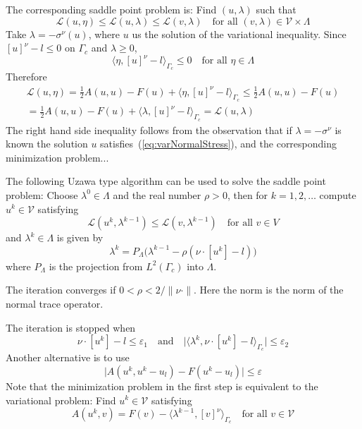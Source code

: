 \documentclass[12pt,a4paper]{article}
\numberwithin{equation}{section}
\numberwithin{table}{section}
\numberwithin{figure}{section}
\newcommand{\half}{\ensuremath{\frac{1}{2}}}
\newcommand{\V}{\ensuremath{\mathcal{V}}}
\newcommand{\Lagrange}{\ensuremath{\mathcal L}}
\renewcommand{\epsilon}{\varepsilon}
\providecommand{\abs}[1]{\lvert #1 \rvert}
\providecommand{\norm}[1]{\lVert #1 \rVert}
\providecommand{\dualp}[2]{\langle #1, #2 \rangle}
\newcommand{\qforall}{\quad\text{for all }}
\begin{document}
The corresponding saddle point problem is: Find $(u,\lambda)$ such that
\begin{equation}
  \label{eq:SaddlePointII}  
  \Lagrange(u,\eta) \le \Lagrange(u,\lambda) \le \Lagrange(v,\lambda)
  \qforall (v,\lambda) \in \V\times\Lambda
\end{equation}
Take $\lambda = -\sigma^\nu(u)$, where $u$ us the solution of the variational inequality.
Since $[u]^\nu -l \le 0$ on $\Gamma_c$ and $\lambda \ge 0$,
\begin{equation}
  \dualp{\eta}{[u]^\nu - l}_{\Gamma_c} \le 0 \qforall \eta\in \Lambda
\end{equation}
Therefore
\begin{multline}
  \Lagrange(u,\eta) = \half A(u,u) - F(u) + \dualp{\eta}{[u]^\nu - l}_{\Gamma_c}
  \le \half A(u,u) - F(u) \\
  = \half A(u,u) - F(u) + \dualp{\lambda}{[u]^\nu - l}_{\Gamma_c}
  = \Lagrange(u,\lambda)
\end{multline}
The right hand side inequality follows from the observation that if $\lambda=-\sigma^\nu$
is known the solution $u$ satisfies~(\ref{eq:varNormalStress}), and the corresponding
minimization problem...

The following Uzawa type algorithm can be used to solve the saddle point problem: Choose
$\lambda^0 \in \Lambda$ and the real number $\rho > 0$, then for $k=1,2,\ldots$ compute
$u^k\in\V$ satisfying
\begin{equation}
  \Lagrange(u^k, \lambda^{k-1}) \le \Lagrange(v, \lambda^{k-1})
  \qforall v \in V
\end{equation}
and $\lambda^k\in \Lambda$ is given by
\begin{equation}
  \lambda^k = P_\Lambda \bigl(\lambda^{k-1} - \rho (\nu\cdot [u^k] - l) \bigr)
\end{equation}
where $P_\Lambda$ is the projection from $L^2(\Gamma_c)$ into $\Lambda$.

The iteration converges if $0 < \rho < 2/\norm{\nu\cdot}$. Here the
norm is the norm of the normal trace operator.

The iteration is stopped when
\begin{equation}
  \nu\cdot [u^k] -l \le \epsilon_1 \quad\text{and}\quad
  \abs{\dualp{\lambda^k}{\nu\cdot [u^k] -l}_{\Gamma_c}} \le \epsilon_2 
\end{equation}
Another alternative is to use
\begin{equation}
  \abs{A(u^k, u^k-u_l) - F(u^k - u_l)} \le \epsilon
\end{equation}
Note that the minimization problem in the first step is equivalent to the variational
problem: Find $u^k\in \V$ satisfying
\begin{equation}
  A(u^k, v) = F(v) - \dualp{\lambda^{k-1}}{[v]^\nu}_{\Gamma_c}
  \qforall v\in \V
\end{equation}
\end{document}

